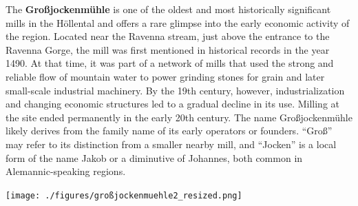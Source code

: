 \documentclass[landscape, a4paper]{article}
\newcommand\alert[1]{\textcolor{PrimaryColor}{\textbf{#1}}}
\begin{document}
\begin{minipage}[t]{0.31\textwidth}
{ %



    The \alert{Großjockenmühle} is one of the oldest and most historically significant mills in the Höllental and offers a rare glimpse into the early economic activity of the region. Located near the Ravenna stream, just above the entrance to the Ravenna Gorge, the mill was first mentioned in historical records in the year 1490. At that time, it was part of a network of mills that used the strong and reliable flow of mountain water to power grinding stones for grain and later small-scale industrial machinery. By the 19th century, however, industrialization and changing economic structures led to a gradual decline in its use. Milling at the site ended permanently in the early 20th century. The name Großjockenmühle likely derives from the family name of its early operators or founders. \enquote{Groß} may refer to its distinction from a smaller nearby mill, and \enquote{Jocken} is a local form of the name Jakob or a diminutive of Johannes, both common in Alemannic-speaking regions. %


	}{
	}

	\texttt{[image: ./figures/großjockenmuehle2\_resized.png]}
	\setlength{\parskip}{0.25cm}


\end{minipage}
\end{document}
